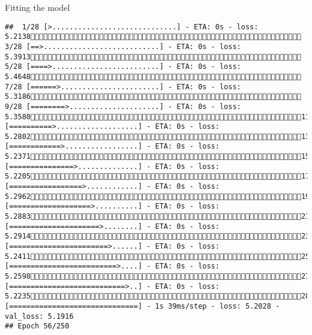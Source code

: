 \documentclass[
  ignorenonframetext,
]{beamer}
\begin{document}
\begin{frame}[fragile]{Fitting the model}
\begin{verbatim}
##  1/28 [>.............................] - ETA: 0s - loss: 5.2138 3/28 [==>...........................] - ETA: 0s - loss: 5.3913 5/28 [====>.........................] - ETA: 0s - loss: 5.4648 7/28 [======>.......................] - ETA: 0s - loss: 5.3186 9/28 [========>.....................] - ETA: 0s - loss: 5.358011/28 [==========>...................] - ETA: 0s - loss: 5.280213/28 [============>.................] - ETA: 0s - loss: 5.237115/28 [===============>..............] - ETA: 0s - loss: 5.220517/28 [=================>............] - ETA: 0s - loss: 5.296219/28 [===================>..........] - ETA: 0s - loss: 5.288321/28 [=====================>........] - ETA: 0s - loss: 5.291423/28 [=======================>......] - ETA: 0s - loss: 5.241125/28 [=========================>....] - ETA: 0s - loss: 5.259827/28 [===========================>..] - ETA: 0s - loss: 5.223528/28 [==============================] - 1s 39ms/step - loss: 5.2028 - val_loss: 5.1916
## Epoch 56/250

\end{verbatim}
\end{frame}
\end{document}
